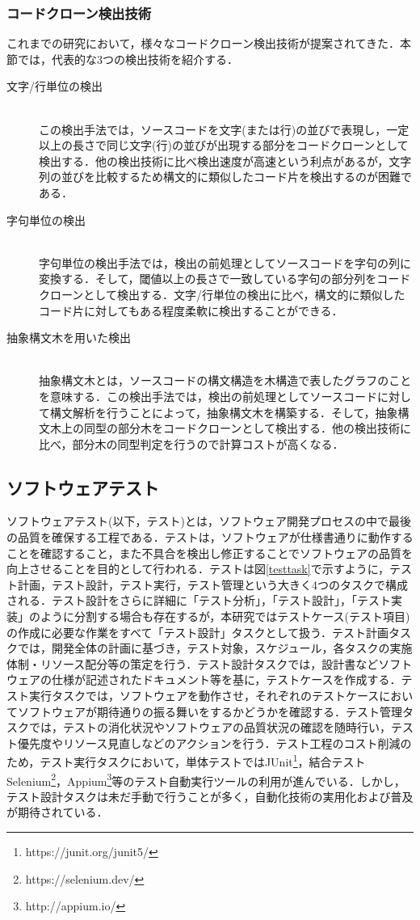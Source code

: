 \documentclass[12pt]{jarticle} %
\begin{document}
\subsubsection{コードクローン検出技術}
これまでの研究において，様々なコードクローン検出技術が提案されてきた\cite{c6,c1}．本節では，代表的な3つの検出技術を紹介する．

\begin{description}
\item[文字/行単位の検出]~\\
この検出手法では，ソースコードを文字(または行)の並びで表現し，一定以上の長さで同じ文字(行)の並びが出現する部分をコードクローンとして検出する．他の検出技術に比べ検出速度が高速という利点があるが，文字列の並びを比較するため構文的に類似したコード片を検出するのが困難である．
\item[字句単位の検出]~\\
字句単位の検出手法では，検出の前処理としてソースコードを字句の列に変換する．そして，閾値以上の長さで一致している字句の部分列をコードクローンとして検出する．文字/行単位の検出に比べ，構文的に類似したコード片に対してもある程度柔軟に検出することができる．
\item[抽象構文木を用いた検出]~\\
抽象構文木とは，ソースコードの構文構造を木構造で表したグラフのことを意味する．この検出手法では，検出の前処理としてソースコードに対して構文解析を行うことによって，抽象構文木を構築する．そして，抽象構文木上の同型の部分木をコードクローンとして検出する．他の検出技術に比べ，部分木の同型判定を行うので計算コストが高くなる．
\end{description}

\subsection{ソフトウェアテスト}
ソフトウェアテスト(以下，テスト)とは，ソフトウェア開発プロセスの中で最後の品質を確保する工程である．テストは，ソフトウェアが仕様書通りに動作することを確認すること，また不具合を検出し修正することでソフトウェアの品質を向上させることを目的として行われる．テストは図\ref{testtask}で示すように，テスト計画，テスト設計，テスト実行，テスト管理という大きく4つのタスクで構成される．テスト設計をさらに詳細に「テスト分析」，「テスト設計」，「テスト実装」のように分割する場合も存在するが，本研究ではテストケース(テスト項目)の作成に必要な作業をすべて「テスト設計」タスクとして扱う．テスト計画タスクでは，開発全体の計画に基づき，テスト対象，スケジュール，各タスクの実施体制・リソース配分等の策定を行う．テスト設計タスクでは，設計書などソフトウェアの仕様が記述されたドキュメント等を基に，テストケースを作成する．テスト実行タスクでは，ソフトウェアを動作させ，それぞれのテストケースにおいてソフトウェアが期待通りの振る舞いをするかどうかを確認する．テスト管理タスクでは，テストの消化状況やソフトウェアの品質状況の確認を随時行い，テスト優先度やリソース見直しなどのアクションを行う．テスト工程のコスト削減のため，テスト実行タスクにおいて，単体テストではJUnit\footnote{https://junit.org/junit5/}，結合テストSelenium\footnote{https://selenium.dev/}，Appium\footnote{http://appium.io/}等のテスト自動実行ツールの利用が進んでいる．しかし，テスト設計タスクは未だ手動で行うことが多く，自動化技術の実用化および普及が期待されている．
\end{document}
